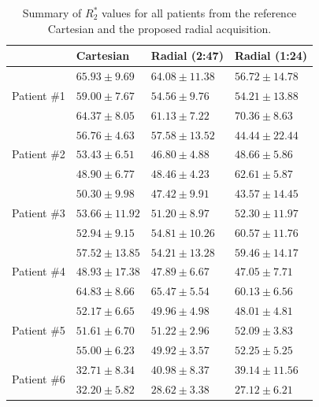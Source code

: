 \documentclass[journal,twoside,web]{ieeecolor}
\begin{document}
\begin{table}[h!]
	\caption{Summary of $R_2^*$ values for all patients from the reference Cartesian and the proposed radial acquisition.}
	\label{TAB:SubjectSTAT_R2S}
	\setlength{\tabcolsep}{3pt}
	\begin{tabular}{m{} m{} m{} m{}}
		\toprule
		& Cartesian & Radial (2:47) & Radial (1:24) \\
		\hline
		\multirow[t]{3}{*}{Patient \#1}   
		& $65.93 \pm 9.69$ & $64.08 \pm 11.38$ & $56.72 \pm 14.78$ \\ %
		& $59.00 \pm 7.67$ & $54.56 \pm  9.76$ & $54.21 \pm 13.88$ \\
		& $64.37 \pm 8.05$ & $61.13 \pm  7.22$ & $70.36 \pm  8.63$ \\
		\hline
		\multirow[t]{3}{*}{Patient \#2}   
		& $56.76 \pm 4.63$ & $57.58 \pm 13.52$ & $44.44 \pm 22.44$ \\ %
        & $53.43 \pm 6.51$ & $46.80 \pm  4.88$ & $48.66 \pm 5.86$ \\
        & $48.90 \pm 6.77$ & $48.46 \pm  4.23$ & $62.61 \pm 5.87$ \\
		\hline
		\multirow[t]{3}{*}{Patient \#3}   
		& $50.30 \pm  9.98$ & $47.42 \pm  9.91$ & $43.57 \pm 14.45$ \\ %
        & $53.66 \pm 11.92$ & $51.20 \pm  8.97$ & $52.30 \pm 11.97$ \\
        & $52.94 \pm  9.15$ & $54.81 \pm 10.26$ & $60.57 \pm 11.76$ \\
		\hline
		\multirow[t]{3}{*}{Patient \#4}   
		& $57.52 \pm 13.85$ & $54.21 \pm 13.28$ & $59.46 \pm 14.17$ \\ %
        & $48.93 \pm 17.38$ & $47.89 \pm 6.67$ & $47.05 \pm 7.71$ \\
        & $64.83 \pm  8.66$ & $65.47 \pm 5.54$ & $60.13 \pm 6.56$ \\
		\hline
		\multirow[t]{3}{*}{Patient \#5}   
		& $52.17 \pm 6.65$ & $49.96 \pm 4.98$ & $48.01 \pm 4.81$ \\ %
        & $51.61 \pm 6.70$ & $51.22 \pm 2.96$ & $52.09 \pm 3.83$ \\
        & $55.00 \pm 6.23$ & $49.92 \pm 3.57$ & $52.25 \pm 5.25$ \\
		\hline
		\multirow[t]{3}{*}{Patient \#6}   
		& $32.71 \pm 8.34$ & $40.98 \pm 8.37$ & $39.14 \pm 11.56$ \\ %
        & $32.20 \pm 5.82$ & $28.62 \pm 3.38$ & $27.12 \pm 6.21$ \\

\end{tabular}
\end{table}
\end{document}

